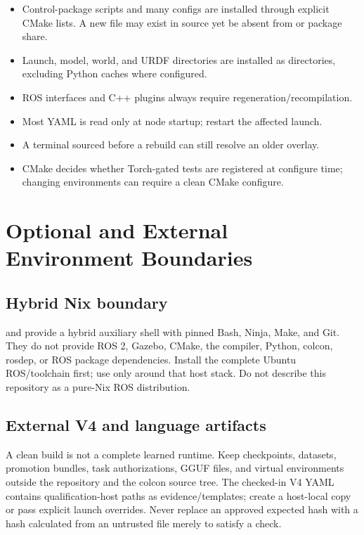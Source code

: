 \begin{itemize}
  \item Control-package scripts and many configs are installed through explicit
        CMake lists. A new file may exist in source yet be absent from
         or package share.
  \item Launch, model, world, and URDF directories are installed as directories,
        excluding Python caches where configured.
  \item ROS interfaces and C++ plugins always require regeneration/recompilation.
  \item Most YAML is read only at node startup; restart the affected launch.
  \item A terminal sourced before a rebuild can still resolve an older overlay.
  \item CMake decides whether Torch-gated tests are registered at configure
        time; changing environments can require a clean CMake configure.
\end{itemize}

\section{Optional and External Environment Boundaries}

\subsection{Hybrid Nix boundary}

 and  provide a hybrid auxiliary shell with
pinned Bash, Ninja, Make, and Git. They do not provide ROS 2, Gazebo, CMake,
the compiler, Python, colcon, rosdep, or ROS package dependencies. Install the
complete Ubuntu ROS/toolchain first; use  only around that
host stack. Do not describe this repository as a pure-Nix ROS distribution.

\subsection{External V4 and language artifacts}

A clean build is not a complete learned runtime. Keep checkpoints, datasets,
promotion bundles, task authorizations, GGUF files, and virtual environments
outside the repository and the colcon source tree. The checked-in V4 YAML
contains qualification-host paths as evidence/templates; create a host-local
copy or pass explicit launch overrides. Never replace an approved expected
hash with a hash calculated from an untrusted file merely to satisfy a check.

